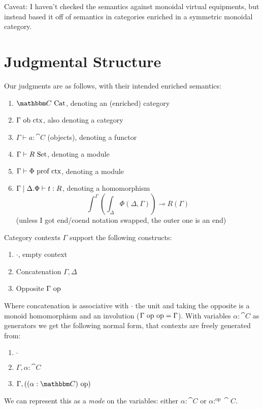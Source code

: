 \documentclass{article}
\begin{document}
\maketitle

Caveat: I haven't checked the semantics against monoidal virtual
equipments, but instead based it off of semantics in categories
enriched in a symmetric monoidal category.

\section{Judgmental Structure}

Our judgments are as follows, with their intended enriched semantics:
\begin{enumerate}
\item $\cat C \isaCat$, denoting an (enriched) category
\item $\Gamma \,\,\textrm{ob ctx}$, also denoting a category
\item $\Gamma \vdash a : \cat C$ (objects), denoting a functor
\item $\Gamma \vdash R \,\,\textrm{Set}$, denoting a module
\item $\Gamma \vdash \Phi \,\,\textrm{prof ctx}$, denoting a module
\item $\Gamma\mathrel{|} \Delta. \Phi \vdash t : R$, denoting a homomorphism 
  \[ \int^\Gamma\left(\int_\Delta \Phi(\Delta,\Gamma)\right) \multimap R(\Gamma)\]
  (unless I got end/coend notation swapped, the outer one is an end)
\end{enumerate}

Category contexts $\Gamma$ support the following constructs:
\begin{enumerate}
\item $\cdot$, empty context
\item Concatenation $\Gamma,\Delta$
\item Opposite $\Gamma \,\,\mathrm{op}$
\end{enumerate}

Where concatenation is associative with $\cdot$ the unit and taking
the opposite is a monoid homomorphism and an involution ($\Gamma
\,\,\mathrm{op}\,\,\mathrm{op} = \Gamma$). With variables $\alpha:\cat C$ as
generators we get the following normal form, that contexts are freely
generated from:
\begin{enumerate}
\item $\cdot$
\item $\Gamma , \alpha : \cat C$
\item $\Gamma , ((\alpha : \cat C) \postfixop)$
\end{enumerate}
We can represent this as a \emph{mode} on the variables: either
$\alpha : \cat C$ or $\alpha :^{\mathrm{op}} \cat C$.
\end{document}
